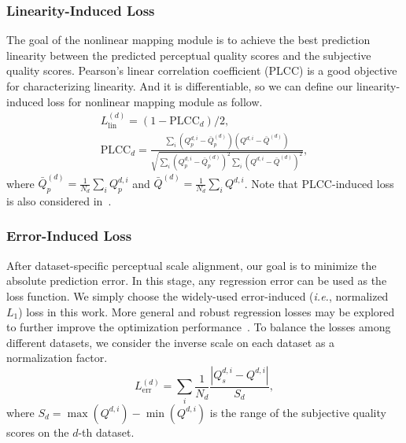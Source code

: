 \documentclass[twocolumn]{svjour3}          \smartqed  \usepackage{graphicx}
\begin{document}
\subsubsection{Linearity-Induced Loss}
The goal of the nonlinear mapping module is to achieve the best prediction linearity between the predicted perceptual quality scores and the subjective quality scores. 
Pearson's linear correlation coefficient (PLCC) is a good objective for characterizing linearity. 
And it is differentiable, so we can define our linearity-induced loss for nonlinear mapping module as follow.
\begin{equation}\label{eq:aloss}
\begin{array}{l}
L^{(d)}_{\mathrm{lin}} =(1-\mathrm{PLCC}_d)/2, \\[2mm]
\mathrm{PLCC}_d=\frac{\sum_{i}(Q^{d, i}_p-\bar{Q}_p^{(d)})(Q^{d, i}-\bar{Q}^{(d)})}{\sqrt{\sum_{i}{(Q^{d, i}_p-\bar{Q}_p^{(d)})}^2\sum_{i}{(Q^{d, i}-\bar{Q}^{(d)})}^2}},
\end{array}
\end{equation}
where $\bar{Q}_p^{(d)}=\frac{1}{N_d}\sum_{i}Q^{d, i}_p$ and $\bar{Q}^{(d)}=\frac{1}{N_d}\sum_{i}Q^{d, i}$. Note that PLCC-induced loss is also considered in~\citep{ma2018geometric,liu2018end,li2020norm}.

\subsubsection{Error-Induced Loss}
After dataset-specific perceptual scale alignment, our goal is to minimize the absolute prediction error. In this stage, any regression error can be used as the loss function. We simply choose the widely-used error-induced (\textit{i.e.}, normalized $L_1$) loss in this work. More general and robust regression losses may be explored to further improve the optimization performance~\citep{barron2019general}. To balance the losses among different datasets, we consider the inverse scale on each dataset as a normalization factor.
\begin{equation}\label{eq:l1}
L^{(d)}_{\mathrm{err}} =\sum_{i} \frac{1}{N_d}\frac{\left|Q^{d, i}_s-Q^{d, i}\right|}{S_d},
\end{equation}
where $S_d=\max{(Q^{d,i})}-\min{(Q^{d,i})}$ is the range of the subjective quality scores on the $d$-th dataset.
\end{document}
